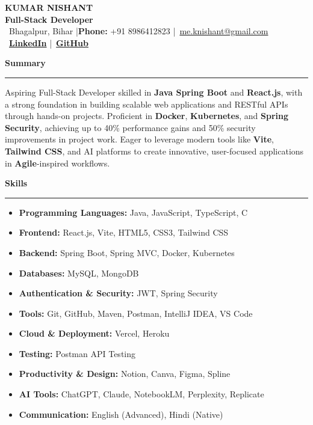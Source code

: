 \documentclass[11pt,a4paper]{article}
\newcommand{\sectionheading}[1]{%
    \vspace{0.5em}%
    {\large\headingfont\color{primary}\textbf{#1}}%
    \vspace{0.25em}%
    \hrule%
    \vspace{0.5em}%
}
\newenvironment{cvitemize}{%
    \begin{itemize}[leftmargin=1.5em, nosep, noitemsep]
}{%
    \end{itemize}
}
\begin{document}
\begin{center}
    {\Huge\headingfont\color{primary}\textbf{KUMAR NISHANT}}\\[0.5em]
    {\large\color{secondary}\textbf{Full-Stack Developer}}\\[0.5em]
    {\small \faMapMarker\ Bhagalpur, Bihar \quad |\quad \textbf{Phone:} +91 8986412823 \quad |\quad \faEnvelope\ \href{mailto:me.knishant@gmail.com}{me.knishant@gmail.com}}\\[0.25em]
    {\small \faLinkedin\ \href{https://www.linkedin.com/in/kumar-nishant-dev/}{\textbf{LinkedIn}} \quad |\quad \faGithub\ \href{https://github.com/K-Nishant-18}{\textbf{GitHub}}}
\end{center}

\sectionheading{Summary}
\noindent Aspiring Full-Stack Developer skilled in \textbf{Java Spring Boot} and \textbf{React.js}, with a strong foundation in building scalable web applications and RESTful APIs through hands-on projects. Proficient in \textbf{Docker}, \textbf{Kubernetes}, and \textbf{Spring Security}, achieving up to 40\% performance gains and 50\% security improvements in project work. Eager to leverage modern tools like \textbf{Vite}, \textbf{Tailwind CSS}, and AI platforms to create innovative, user-focused applications in \textbf{Agile}-inspired workflows.

\sectionheading{Skills}
\begin{cvitemize}
    \item \textbf{Programming Languages:} Java, JavaScript, TypeScript, C
    \item \textbf{Frontend:} React.js, Vite, HTML5, CSS3, Tailwind CSS
    \item \textbf{Backend:} Spring Boot, Spring MVC, Docker, Kubernetes
    \item \textbf{Databases:} MySQL, MongoDB
    \item \textbf{Authentication \& Security:} JWT, Spring Security
    \item \textbf{Tools:} Git, GitHub, Maven, Postman, IntelliJ IDEA, VS Code
    \item \textbf{Cloud \& Deployment:} Vercel, Heroku
    \item \textbf{Testing:} Postman API Testing
    \item \textbf{Productivity \& Design:} Notion, Canva, Figma, Spline
    \item \textbf{AI Tools:} ChatGPT, Claude, NotebookLM, Perplexity, Replicate
    \item \textbf{Communication:} English (Advanced), Hindi (Native)
\end{cvitemize}
\end{document}
